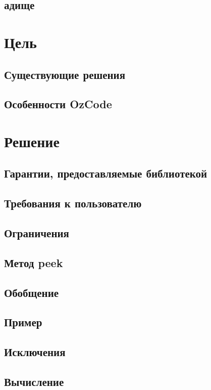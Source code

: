 \subsection{адище}


\section{Цель}

\subsection{Существующие решения}

\subsection{Особенности OzCode}


\section{Решение}
\subsection{Гарантии, предоставляемые библиотекой}

\subsection{Требования к пользователю}

\subsection{Ограничения}

\subsection{Метод peek}


\subsection{Обобщение}

\subsection{Пример}

\subsection{Исключения}

\subsection{Вычисление}





